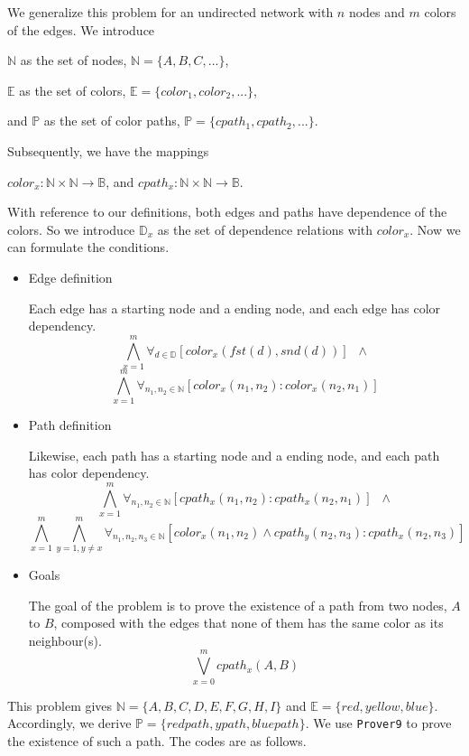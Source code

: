 We generalize this problem for an undirected network with $n$ nodes and $m$ colors of the edges. We introduce
\begin{center}
$\mathbb{N}$ as the set of nodes, $\mathbb{N} = \{A, B, C, ... \}$,

$\mathbb{E}$ as the set of colors, $\mathbb{E} = \{color_1, color_2, ...\}$,

and $\mathbb{P}$ as the set of color paths, $\mathbb{P} = \{cpath_1, cpath_2, ...\}$.
\end{center}
Subsequently, we have the mappings
\begin{center}
$color_x : \mathbb{N}\times \mathbb{N} \rightarrow \mathbb{B}$, and $cpath_x : \mathbb{N}\times \mathbb{N} \rightarrow \mathbb{B}$.
\end{center}

With reference to our definitions, both edges and paths have dependence of the colors. So we introduce $\mathbb{D}_x$ as the set of dependence relations with $color_x$. Now we can formulate the conditions.

\begin{itemize}
  \item Edge definition

  Each edge has a starting node and a ending node, and each edge has color dependency.
  \[ \bigwedge_{x=1}^m \forall_{d \in \mathbb{D}} [color_x(fst(d), snd(d))] \;\; \wedge \]
  \[ \bigwedge_{x=1}^m \forall_{n_1, n_2 \in \mathbb{N}} [color_x(n_1, n_2) : color_x(n_2, n_1)] \]

  \item Path definition

  Likewise, each path has a starting node and a ending node, and each path has color dependency.
  \[ \bigwedge_{x=1}^m \forall_{n_1, n_2 \in \mathbb{N}} [cpath_x(n_1, n_2) : cpath_x(n_2, n_1)] \;\; \wedge \]
  \[ \bigwedge_{x=1}^m \bigwedge_{y=1,y\neq x}^m \forall_{n_1, n_2, n_3 \in \mathbb{N}} [color_x(n_1, n_2) \wedge cpath_y(n_2, n_3) : cpath_x(n_2, n_3)] \]

  \item Goals

  The goal of the problem is to prove the existence of a path from two nodes, $A$ to $B$, composed with the edges that none of them has the same color as its neighbour(s).
  \[ \bigvee_{x=0}^m cpath_x(A, B) \]

\end{itemize}

This problem gives $\mathbb{N} = \{A, B, C, D, E, F, G, H, I \}$ and $\mathbb{E} = \{red, yellow, blue \}$. Accordingly, we derive $\mathbb{P} = \{redpath, ypath, bluepath\}$. We use {\tt Prover9} to prove the existence of such a path. The codes are as follows.

